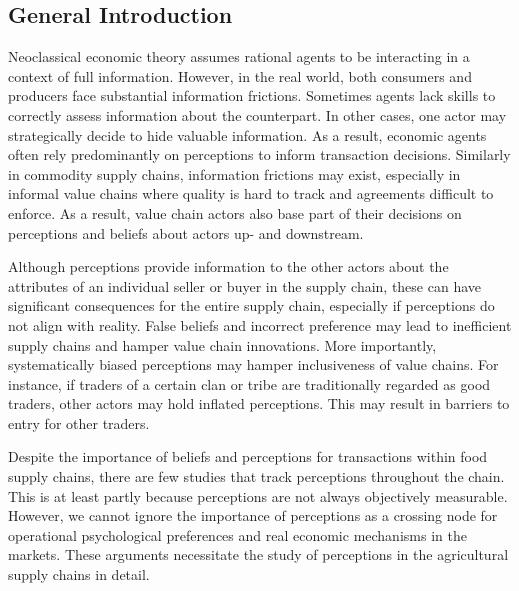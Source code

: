 \documentclass[12pt,english]{article}\usepackage[]{graphicx}\usepackage[]{color}
\begin{document}
\begin{onehalfspace}
\newpage{}
\end{onehalfspace}

\begin{singlespace}
\tableofcontents{}
\end{singlespace}

\begin{onehalfspace}
\newpage{}
\end{onehalfspace}
\begin{onehalfspace}

\section{General Introduction\label{sec:General-Introduction}}
\end{onehalfspace}

Neoclassical economic theory assumes rational agents to be interacting
in a context of full information. However, in the real world, both
consumers and producers face substantial information frictions. Sometimes
agents lack skills to correctly assess information about the counterpart.
In other cases, one actor may strategically decide to hide valuable
information. As a result, economic agents often rely predominantly
on perceptions to inform transaction decisions. Similarly in commodity
supply chains, information frictions may exist, especially in informal
value chains where quality is hard to track and agreements difficult
to enforce. As a result, value chain actors also base part of their
decisions on perceptions and beliefs about actors up- and downstream.

Although perceptions provide information to the other actors about
the attributes of an individual seller or buyer in the supply chain,
these can have significant consequences for the entire supply chain,
especially if perceptions do not align with reality. False beliefs
and incorrect preference may lead to inefficient supply chains and
hamper value chain innovations. More importantly, systematically biased
perceptions may hamper inclusiveness of value chains. For instance,
if traders of a certain clan or tribe are traditionally regarded as
good traders, other actors may hold inflated perceptions. This may
result in barriers to entry for other traders.

Despite the importance of beliefs and perceptions for transactions
within food supply chains, there are few studies that track perceptions
throughout the chain. This is at least partly because perceptions
are not always objectively measurable. However, we cannot ignore the
importance of perceptions as a crossing node for operational psychological
preferences and real economic mechanisms in the markets. These arguments
necessitate the study of perceptions in the agricultural supply chains
in detail.
\end{document}
